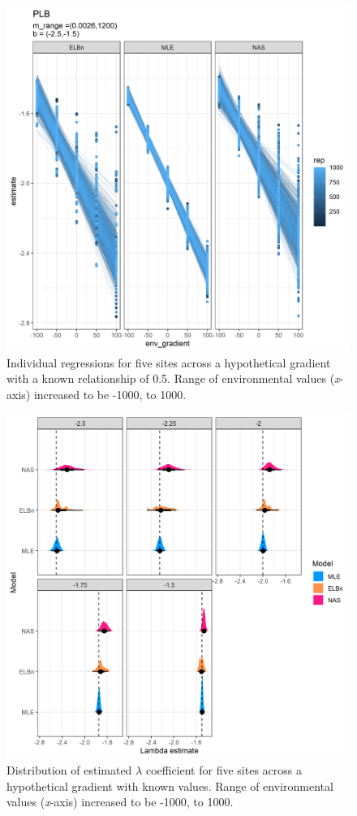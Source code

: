 \documentclass[
]{article}
\begin{document}
\begin{figure}
\centering
\includegraphics{figures/PLB_large_x_main.png}
\caption{Individual regressions for five sites across a hypothetical
gradient with a known relationship of 0.5. Range of environmental values
(\emph{x}-axis) increased to be -1000, to 1000.}
\end{figure}

\newpage

\begin{figure}
\centering
\includegraphics{figures/PLB_large_x_est_b_density.png}
\caption{Distribution of estimated \(\lambda\) coefficient for five
sites across a hypothetical gradient with known values. Range of
environmental values (\emph{x}-axis) increased to be -1000, to 1000.}
\end{figure}
\end{document}
